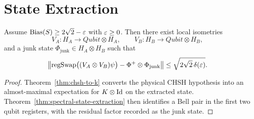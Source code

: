 \section{State Extraction}

\begin{theorem}
\label{thm:state-extraction}
Assume $\operatorname{Bias}(S) \ge 2\sqrt{2} - \varepsilon$ with $\varepsilon \ge 0$.
Then there exist local isometries
\[
V_A : H_A \to Qubit \otimes H_A,
\qquad
V_B : H_B \to Qubit \otimes H_B,
\]
and a junk state $\Phi_{\mathrm{junk}} \in H_A \otimes H_B$ such that
\[
\left\lVert 
\mathrm{regSwap}\bigl((V_A \otimes V_B)\psi\bigr)
-
\Phi^+ \otimes \Phi_{\mathrm{junk}}
 \right\rVert
\le \sqrt{2\sqrt{2}\,\delta(\varepsilon)}.
\]
\end{theorem}

\begin{proof}
Theorem~\ref{thm:chsh-to-k} converts the physical CHSH hypothesis into an almost-maximal expectation for $K \otimes \mathrm{Id}$ on the extracted state.
Theorem~\ref{thm:spectral-state-extraction} then identifies a Bell pair in the first two qubit registers, with the residual factor recorded as the junk state.
\end{proof}
